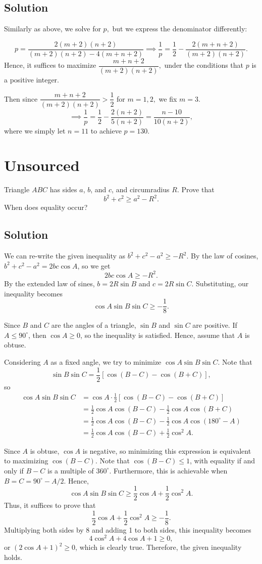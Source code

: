 \documentclass{article}
\begin{document}
\subsection{Solution}
Similarly as above, we solve for $p,$ but we express the denominator differently:

\[p=\dfrac{2(m+2)(n+2)}{(m+2)(n+2)-4(m+n+2)} \implies \dfrac{1}{p}=\dfrac{1}{2}-\dfrac{2(m+n+2)}{(m+2)(n+2)}.\]Hence, it suffices to maximize $\dfrac{m+n+2}{(m+2)(n+2)},$ under the conditions that $p$ is a positive integer.

Then since $\dfrac{m+n+2}{(m+2)(n+2)}>\dfrac{1}{2}$ for $m=1,2,$ we fix $m=3.$\[\implies \dfrac{1}{p}=\dfrac{1}{2}-\dfrac{2(n+2)}{5(n+2)}=\dfrac{n-10}{10(n+2)},\]where we simply let $n=11$ to achieve $p=\boxed{130}.$
\pagebreak\section{Unsourced}
Triangle $ABC$ has sides $a$, $b$, and $c$, and circumradius $R$. Prove that
\[b^2 + c^2 \ge a^2 - R^2.\]
When does equality occur?
\subsection{Solution}
We can re-write the given inequality as $b^2 + c^2 - a^2 \ge -R^2$. By the law of cosines, $b^2 + c^2 - a^2 = 2bc \cos A$, so we get
\[2bc \cos A \ge -R^2.\]
By the extended law of sines, $b = 2R \sin B$ and $c = 2R \sin C$. Substituting, our inequality becomes
\[\cos A \sin B \sin C \ge -\frac{1}{8}.\]

Since $B$ and $C$ are the angles of a triangle, $\sin B$ and $\sin C$ are positive. If $A \le 90^\circ$, then $\cos A \ge 0$, so the inequality is satisfied. Hence, assume that $A$ is obtuse.

Considering $A$ as a fixed angle, we try to minimize $\cos A \sin B \sin C$. Note that
\[\sin B \sin C = \frac{1}{2} [\cos (B - C) - \cos (B + C)],\]
so
\begin{align*}
\cos A \sin B \sin C &= \cos A \cdot \frac{1}{2} [\cos (B - C) - \cos (B + C)] \\
&= \frac{1}{2} \cos A \cos (B - C) - \frac{1}{2} \cos A \cos (B + C) \\
&= \frac{1}{2} \cos A \cos (B - C) - \frac{1}{2} \cos A \cos (180^\circ - A) \\
&= \frac{1}{2} \cos A \cos (B - C) + \frac{1}{2} \cos^2 A.
\end{align*}

Since $A$ is obtuse, $\cos A$ is negative, so minimizing this expression is equivalent to maximizing $\cos (B - C)$. Note that $\cos (B - C) \le 1$, with equality if and only if $B - C$ is a multiple of $360^\circ$. Furthermore, this is achievable when $B = C = 90^\circ - A/2$. Hence,
\[\cos A \sin B \sin C \ge \frac{1}{2} \cos A + \frac{1}{2} \cos^2 A.\]
Thus, it suffices to prove that
\[\frac{1}{2} \cos A + \frac{1}{2} \cos^2 A \ge -\frac{1}{8}.\]
Multiplying both sides by 8 and adding 1 to both sides, this inequality becomes
\[4 \cos^2 A + 4 \cos A + 1 \ge 0,\]
or $(2 \cos A + 1)^2 \ge 0$, which is clearly true. Therefore, the given inequality holds.
\end{document}
